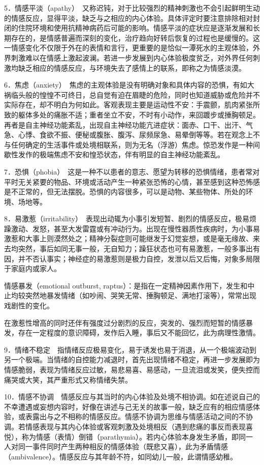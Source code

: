 5．情感平淡（apathy）　又称迟钝，对于比较强烈的精神刺激也不会引起鲜明生动的情感反应，显得平淡，缺乏与之相应的内心体验。具体评定时要注意排除相对封闭的住院环境和使用抗精神病药后可能的影响。情感平淡的症状应是逐渐发展和长期存在的，是情感普遍而深刻的变化，治疗趋向好转后恢复的过程也是缓慢的。这一情感变化不仅限于外在的表情和言行，更重要的是恰似一潭死水的主观体验，外界刺激难以在情感上激起波澜。若进一步发展到内心体验极度贫乏，对外界任何刺激均缺乏相应的情感反应，与环境失去了感情上的联系，即称之为情感淡漠。

6．焦虑（anxiety）　焦虑的主观体验是没有明确对象和具体内容的恐惧，有如大祸临头般的惶惶不可终日，总自觉有迫在眉睫的危险，同时也知道威胁或危险并不实际存在，却不明白为何如此。客观表现主要是运动性不安：手震颤，肌肉紧张所致的躯体多处的痛胀不适；重者坐立不安，不时有小动作，来回踱步或捶胸顿足。再者是自主神经功能紊乱，出现自主神经功能亢进症状：面赤、口干、出汗、气急、心悸、食欲不振、便秘或腹胀、腹泻、尿频尿急、易晕倒等等。若在观念上不与任何确定的生活事件或处境相联系，则为无名（浮游）焦虑。惊恐发作是一种间歇性发作的极端焦虑不安和惶恐状态，伴有明显的自主神经功能紊乱。

7．恐惧（phobia）　这是一种不以患者的意志、愿望为转移的恐惧情绪，患者常对平时无关紧要的物品、环境或活动产生一种紧张恐怖的心情，甚至感到这种恐怖感是不正常的，但无法摆脱。恐惧的内容很多，可以是动物、某些物体、所处的环境、场地等。

8．易激惹（irritability）　表现出动辄为小事引发短暂、剧烈的情感反应，极易烦躁激动、发怒，甚至大发雷霆或有冲动行为。出现在慢性器质性疾病时，为小事易激惹和大事上则漠然处之；精神分裂症则可能继发于幻觉妄想，或是毫无缘故、来去均突然，事后如同无事一般，无自知力；躁狂状态也可有易激惹，一般多事出有因，并不否认事实；神经症的易激惹则是极力自控，发泄以后又后悔，对象多局限于家庭内或家人。

情感暴发（emotional outburst,
raptus）：是指在一定精神因素作用下，发生和中止均较突然地暴发情绪（如吵闹、哭笑无常、捶胸顿足、满地打滚等），常常出现戏剧性的变化。

在激惹性增高的同时还伴有强度过分剧烈的反应，突发的、强烈而短暂的情感暴发，存在一定程度的意识障碍，发作后入睡，事后又不能回忆，此为病理性激情。

9．情绪不稳定　指情绪反应极易变化，易于诱发也易于消退，从一个极端波动到另一个极端。当情绪的自控能力减退时，首先出现情绪不稳定，再进一步发展即为情感脆弱，表现为情绪反应过敏，易悲易喜、易感动，一旦流泪或发笑，便失控而痛哭或大笑，其严重形式又称情绪失禁。

10．情感不协调　情感反应与其当时的内心体验及处境不相协调。如在述说自己的不幸遭遇或妄想内容时，好像在讲述与己无关的故事一般，缺乏应有的相应情感体验，或表露出与之不相称的情感反应。情感不协调为思维与情感活动之间的不协调。若情感表现与其内心体验或客观刺激及处境相反（遇到悲痛的事反而表现喜悦），称为情感（表情）倒错（parathymia）。若内心体验本身发生矛盾，即同一人对同一事件同时产生两种相反的情感体验（既悲又喜），此为矛盾情感（ambivalence）。情感反应与其年龄不符，如同幼儿一般，此谓情感幼稚。

